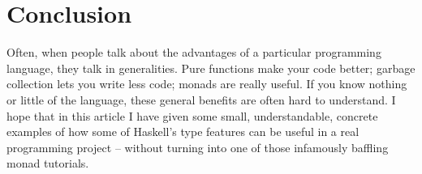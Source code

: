 \documentclass{tmr}
\begin{document}
\section{Conclusion}

Often, when people talk about the advantages of a particular programming language, they talk in generalities.  Pure functions make your code better; garbage collection lets you write less code; monads are really useful.  If you know nothing or little of the language, these general benefits are often hard to understand.  I hope that in this article I have given some small, understandable, concrete examples of how some of Haskell's type features can be useful in a real programming project -- without turning into one of those infamously baffling monad tutorials.



%
\end{document}
